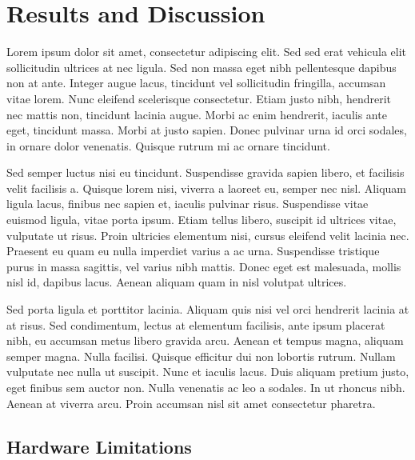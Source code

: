 \chapter{Results and Discussion}
\label{ch:results}

Lorem ipsum dolor sit amet, consectetur adipiscing elit. Sed sed erat vehicula elit sollicitudin ultrices at nec ligula. Sed non massa eget nibh pellentesque dapibus non at ante. Integer augue lacus, tincidunt vel sollicitudin fringilla, accumsan vitae lorem. Nunc eleifend scelerisque consectetur. Etiam justo nibh, hendrerit nec mattis non, tincidunt lacinia augue. Morbi ac enim hendrerit, iaculis ante eget, tincidunt massa. Morbi at justo sapien. Donec pulvinar urna id orci sodales, in ornare dolor venenatis. Quisque rutrum mi ac ornare tincidunt.

Sed semper luctus nisi eu tincidunt. Suspendisse gravida sapien libero, et facilisis velit facilisis a. Quisque lorem nisi, viverra a laoreet eu, semper nec nisl. Aliquam ligula lacus, finibus nec sapien et, iaculis pulvinar risus. Suspendisse vitae euismod ligula, vitae porta ipsum. Etiam tellus libero, suscipit id ultrices vitae, vulputate ut risus. Proin ultricies elementum nisi, cursus eleifend velit lacinia nec. Praesent eu quam eu nulla imperdiet varius a ac urna. Suspendisse tristique purus in massa sagittis, vel varius nibh mattis. Donec eget est malesuada, mollis nisl id, dapibus lacus. Aenean aliquam quam in nisl volutpat ultrices.

Sed porta ligula et porttitor lacinia. Aliquam quis nisi vel orci hendrerit lacinia at at risus. Sed condimentum, lectus at elementum facilisis, ante ipsum placerat nibh, eu accumsan metus libero gravida arcu. Aenean et tempus magna, aliquam semper magna. Nulla facilisi. Quisque efficitur dui non lobortis rutrum. Nullam vulputate nec nulla ut suscipit. Nunc et iaculis lacus. Duis aliquam pretium justo, eget finibus sem auctor non. Nulla venenatis ac leo a sodales. In ut rhoncus nibh. Aenean at viverra arcu. Proin accumsan nisl sit amet consectetur pharetra.

\section{Hardware Limitations} %
